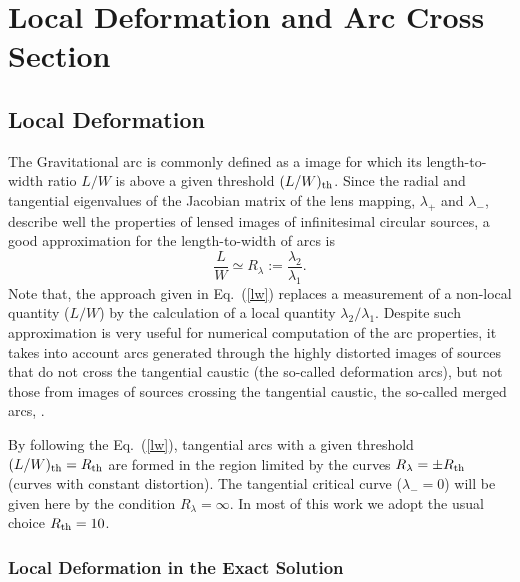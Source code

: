 \documentclass[useAMS,usenatbib]{mn2e}
\begin{document}
\begin{itemize}
\end{itemize}

\section{Local Deformation and Arc Cross Section}

\subsection{Local Deformation}

The Gravitational arc is commonly defined as a image for which its length-to-width ratio $L/W$ is above a given threshold
$(L/W)_{\rm th}$. Since the radial and tangential eigenvalues of the Jacobian matrix of the lens mapping, $\lambda_{+}$  and $\lambda_{-}$, describe well the properties of lensed images of infinitesimal circular sources, a good approximation for the length-to-width of arcs \citep{wu93,bartelmann94,haman97} is
\begin{equation}
\frac{L}{W}\simeq R_\lambda := \frac{\lambda_{2}}{\lambda_{1}}\label{lw}.
\end{equation}
 Note that, the approach given in Eq.~(\ref{lw}) replaces a measurement of a non-local quantity ($L/W$) by the calculation of a local quantity $\lambda_{2}/\lambda_{1}$. Despite such approximation is very useful for numerical computation of the arc properties, it takes into  account arcs generated through the highly distorted images of sources that do not cross the tangential caustic (the so-called deformation arcs), but not those from images of sources crossing the tangential caustic, the so-called merged arcs, \citep{rozo08,cunha10}.

 By following the Eq.~(\ref{lw}), tangential arcs with a given threshold $(L/W)_{\rm th} = R_{\rm th}$ are formed in the region limited  by the curves $R_\lambda=\pm R_{\rm th}$ (curves with constant distortion). The tangential critical curve ($\lambda_{-}=0$) will be given here by the condition $R_\lambda=\infty$. In most of this work we adopt the usual choice $R_{\rm th}=10$.

 \subsubsection{Local Deformation in the Exact Solution}
\end{document}
